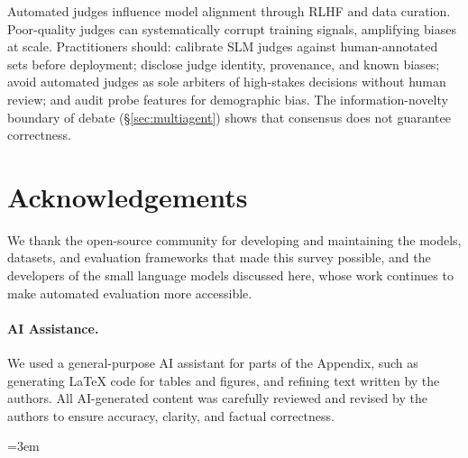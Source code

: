 \documentclass[11pt]{article}
\begin{document}
Automated judges influence model alignment through RLHF and data curation. Poor-quality judges can systematically corrupt training signals, amplifying biases at scale. Practitioners should: calibrate SLM judges against human-annotated sets before deployment; disclose judge identity, provenance, and known biases; avoid automated judges as sole arbiters of high-stakes decisions without human review; and audit probe features for demographic bias. The information-novelty boundary of debate (\S\ref{sec:multiagent}) shows that consensus does not guarantee correctness.

\section*{Acknowledgements}

We thank the open-source community for developing and maintaining the models, datasets, and evaluation frameworks that made this survey possible, and the developers of the small language models discussed here, whose work continues to make automated evaluation more accessible.

\paragraph{AI Assistance.} We used a general-purpose AI assistant for parts of the Appendix, such as generating LaTeX code for tables and figures, and refining text written by the authors. All AI-generated content was carefully reviewed and revised by the authors to ensure accuracy, clarity, and factual correctness.

\begingroup
\emergencystretch=3em

\endgroup

\appendix

\end{document}
